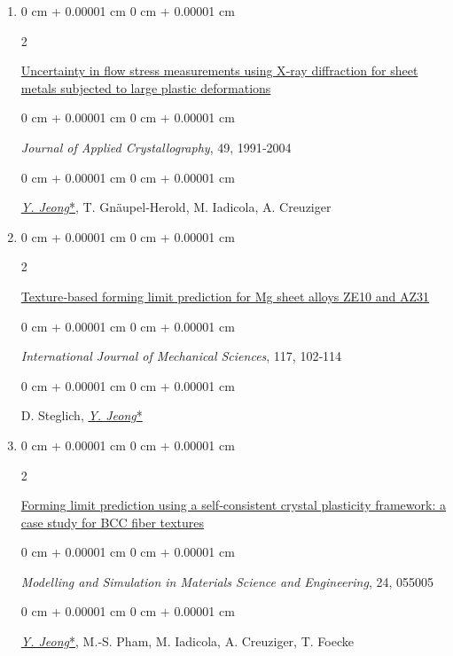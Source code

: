 \documentclass[10pt, letterpaper]{article}
\newenvironment{onecolentry}{
    \begin{adjustwidth}{
        0 cm + 0.00001 cm
    }{
        0 cm + 0.00001 cm
    }
}{
    \end{adjustwidth}
} %
\newenvironment{twocolentry}[2][]{
    \onecolentry
    \def\secondColumn{#2}
    \setcolumnwidth{\fill, 4.5 cm}
    \begin{paracol}{2}
}{
    \switchcolumn \raggedleft \secondColumn
    \end{paracol}
    \endonecolentry
} %
\begin{document}
\begin{enumerate}
        \item
        \begin{twocolentry}{2016}
            \href{https://doi.org/10.1107/S1600576716013662}{Uncertainty in flow stress measurements using X‑ray diffraction for sheet metals subjected to large plastic deformations}
        \end{twocolentry}
        \begin{onecolentry}
            {\it Journal of Applied Crystallography}, 49, 1991‑2004
        \end{onecolentry}
        \begin{onecolentry}
            {\underline{\textit{Y. Jeong}*}}, T. Gnäupel‑Herold, M. Iadicola, A. Creuziger
        \end{onecolentry}
        \vspace{0.10 cm}


        \item
        \begin{twocolentry}{2016}
            \href{http://dx.doi.org/10.1016/j.ijmecsci.2016.08.013}{Texture‑based forming limit prediction for Mg sheet alloys ZE10 and AZ31 }
        \end{twocolentry}
        \begin{onecolentry}
            {\it International Journal of Mechanical Sciences}, 117, 102‑114
        \end{onecolentry}
        \begin{onecolentry}
            D. Steglich, {\underline{\textit{Y. Jeong}*}}
        \end{onecolentry}
        \vspace{0.10 cm}


        \item
        \begin{twocolentry}{2016}
            \href{http://dx.doi.org/10.1088/0965-0393/24/5/055005}{Forming limit prediction using a self‑consistent crystal plasticity framework: a case study for BCC fiber textures}
        \end{twocolentry}
        \begin{onecolentry}
            {\it Modelling and Simulation in Materials Science and Engineering}, 24, 055005
        \end{onecolentry}
        \begin{onecolentry}
            {\underline{\textit{Y. Jeong}*}}, M.‑S. Pham, M. Iadicola, A. Creuziger, T. Foecke
        \end{onecolentry}
        \vspace{0.10 cm}


\end{enumerate}
\end{document}
